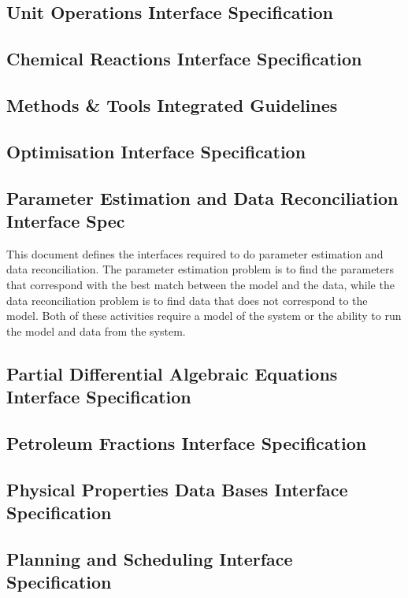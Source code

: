 \subsection{Unit Operations Interface Specification}

\subsection{Chemical Reactions Interface Specification}

\subsection{Methods \& Tools Integrated Guidelines}

\subsection{Optimisation Interface Specification}

\subsection{Parameter Estimation and Data Reconciliation Interface Spec}
This document defines the interfaces required to do parameter estimation and data reconciliation.  The parameter estimation problem is to find the parameters that correspond with the best match between the model and the data, while the data reconciliation problem is to find data that does not correspond to the model.  Both of these activities require a model of the system or the ability to run the model and data from the system.  

\subsection{Partial Differential Algebraic Equations Interface Specification}

\subsection{Petroleum Fractions Interface Specification}

\subsection{Physical Properties Data Bases Interface Specification}

\subsection{Planning and Scheduling Interface Specification}

